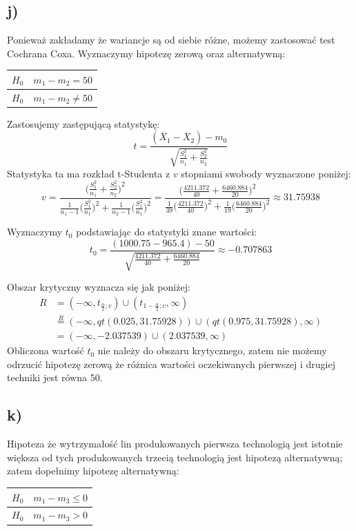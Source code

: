 \documentclass{article}
\begin{document}
\subsection{j)}
Ponieważ zakładamy że wariancje są od siebie różne, możemy zastosować test Cochrana Coxa. Wyznaczymy hipotezę zerową oraz alternatywną:
\begin{center} \begin{tabular}{|c|c|} \hline
$H_0$ & $m_1 - m_2 = 50$ \\ \hline
$H_0$ & $m_1 - m_2 \neq 50$  \\ \hline
\end{tabular} \end{center}

Zastosujemy zastępującą statystykę:
\[ t = \frac{(\overline{X}_1 - \overline{X}_2) - m_0}{ \sqrt{\frac{S_1^2}{n_1} + \frac{S_2^2}{n_2}} } \]
Statystyka ta ma rozkład t-Studenta z $v$ stopniami swobody wyznaczone poniżej:
\[ v = \frac{ \big( \frac{S_1^2}{n_1} + \frac{S_2^2}{n_2} \big)^2 }{ \frac{1}{n_1 - 1} \big(\frac{S_1^2}{n_1}\big)^2 + \frac{1}{n_2-1}\big(\frac{S_1^2}{n_1}\big)^2} = \frac{ \big( \frac{4211.372}{40} + \frac{6460.884}{20} \big)^2 }{ \frac{1}{39} \big(\frac{4211.372}{40}\big)^2 + \frac{1}{19}\big(\frac{6460.884}{20}\big)^2} \approx 31.75938\]

Wyznaczymy $t_0$ podstawiając do statystyki znane wartości:
\[ t_0 =  \frac{( 1000.75 - 965.4) - 50}{ \sqrt{\frac{4211.372}{40} + \frac{6460.884}{20}} } \approx -0.707863 \]

Obszar krytyczny wyznacza się jak poniżej:
\begin{align*}
R & = (-\infty, t_{\frac{\alpha}{2};v}) \cup ( t_{1 - \frac{\alpha}{2};v}, \infty ) \\
& \overset{R}{=} (-\infty, qt(0.025, 31.75928) )\cup ( qt(0.975, 31.75928), \infty) \\
& = ( -\infty, -2.037539) \cup ( 2.037539, \infty)
\end{align*}
Obliczona wartość $t_0$ nie należy do obszaru krytycznego, zatem nie możemy odrzucić hipotezę zerową że różnica wartości oczekiwanych pierwszej i drugiej techniki jest równa 50.

\subsection{k)}
Hipoteza że wytrzymałość lin produkowanych pierwsza technologią jest istotnie większa od tych produkowanych trzecią technologią jest hipotezą alternatywną; zatem dopełnimy hipotezę alternatywną:
\begin{center} \begin{tabular}{|c|c|} \hline
$H_0$ & $m_1 - m_3 \leq 0$ \\ \hline
$H_0$ & $m_1 - m_3 > 0$  \\ \hline
\end{tabular} \end{center}
\end{document}
